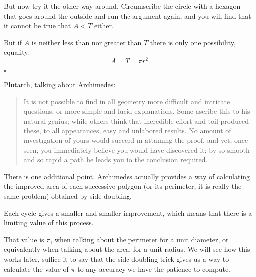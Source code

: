\documentclass[11pt, oneside]{article}
\begin{document}
But now try it the other way around. Circumscribe the circle with a hexagon that goes around the outside and run the argument again, and you will find that it cannot be true that $A < T$ either.

But if $A$ is neither less than nor greater than $T$ there is only one possibility, equality:
\[ A = T = \pi r^2 \]

$\square$

Plutarch, talking about Archimedes:

\begin{quote}It is not possible to find in all geometry more difficult and intricate questions, or more simple and lucid explanations. Some ascribe this to his natural genius; while others think that incredible effort and toil produced these, to all appearances, easy and unlabored results. No amount of investigation of yours would succeed in attaining the proof, and yet, once seen, you immediately believe you would have discovered it; by so smooth and so rapid a path he leads you to the conclusion required.\end{quote}

There is one additional point.  Archimedes actually provides a way of calculating the improved area of each successive polygon (or its perimeter, it is really the same problem) obtained by side-doubling.

Each cycle gives a smaller and smaller improvement, which means that there is a limiting value of this process.

That value is $\pi$, when talking about the perimeter for a unit diameter, or equivalently  when talking about the area, for a unit radius.  We will see how this works later, suffice it to say that the side-doubling trick gives us a way to calculate the value of $\pi$ to any accuracy we have the patience to compute.
\end{document}
